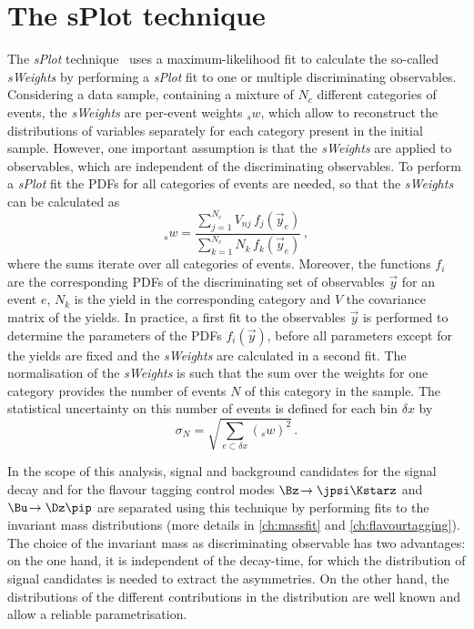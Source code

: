 \section{The sPlot technique}
\label{sec:splot}

The \emph{sPlot} technique~\cite{Pivk:2004ty} uses a maximum-likelihood fit to calculate the so-called \emph{sWeights} by performing a \emph{sPlot} fit to one or multiple discriminating observables.
Considering a data sample, containing a mixture of $N_c$ different categories of events, the \emph{sWeights} are per-event weights ${}_sw$, which allow to reconstruct the distributions of variables separately for each category present in the initial sample.
However, one important assumption is that the \emph{sWeights} are applied to observables, which are independent of the discriminating observables.
To perform a \emph{sPlot} fit the PDFs for all categories of events are needed, so that the \emph{sWeights} can be calculated as
\begin{equation}
{}_sw=\frac{\sum_{j=1}^{N_c}V_{nj}\,f_j(\vec{y}_e)}{\sum_{k=1}^{N_c}N_k\,f_k(\vec{y}_e)}\,,
\end{equation}
where the sums iterate over all categories of events.
Moreover, the functions $f_i$ are the corresponding PDFs of the discriminating set of observables $\vec{y}$ for an event $e$, $N_k$ is the yield in the corresponding category and $V$ the covariance matrix of the yields.
In practice, a first fit to the observables $\vec{y}$ is performed to determine the parameters of the PDFs $f_i(\vec{y})$, before all parameters except for the yields are fixed and the \emph{sWeights} are calculated in a second fit.
The normalisation of the \emph{sWeights} is such that the sum over the weights for one category provides the number of events $N$ of this category in the sample.
The statistical uncertainty on this number of events is defined for each bin $\delta x$ by
\begin{equation}
\sigma_N=\sqrt{\sum_{e\subset\delta x}({}_sw)^2}\,.
\end{equation}

In the scope of this analysis, signal and background candidates for the signal decay \mbox{\BdToDpi} and for the flavour tagging control modes $\Bz\!\to\jpsi\Kstarz$ and $\Bu\!\to\Dz\pip$ are separated using this technique by performing fits to the invariant mass distributions (more details in \cref{ch:massfit} and \cref{ch:flavourtagging}).
The choice of the invariant mass as discriminating observable has two advantages:
on the one hand, it is independent of the decay-time, for which the distribution of signal candidates is needed to \eg extract the \CP asymmetries.
On the other hand, the distributions of the different contributions in the distribution are well known and allow a reliable parametrisation.

